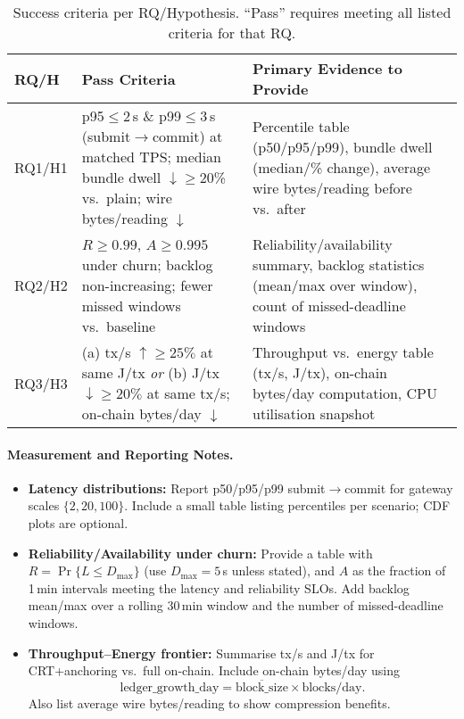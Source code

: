 \documentclass[12pt,onecolumn]{IEEEtran} %
\begin{document}
\begin{table}[htbp]
  \centering
  \caption{Success criteria per RQ/Hypothesis. ``Pass'' requires meeting all listed criteria for that RQ.}
  \label{tab:success-criteria}
  \begin{tabular}{p{2cm} p{9.5cm} p{3.5cm}}
    \toprule
    \textbf{RQ/H} & \textbf{Pass Criteria} & \textbf{Primary Evidence to Provide} \\
    \midrule
    RQ1/H1 &
    p95$\leq$2\,s \& p99$\leq$3\,s (submit$\to$commit) at matched TPS; median bundle dwell $\downarrow\geq$20\% vs.\ plain; wire bytes/reading $\downarrow$ &
    Percentile table (p50/p95/p99), bundle dwell (median/\% change), average wire bytes/reading before vs.\ after \\
    \addlinespace
    RQ2/H2 &
    $R\geq0.99$, $A\geq0.995$ under churn; backlog non-increasing; fewer missed windows vs.\ baseline &
    Reliability/availability summary, backlog statistics (mean/max over window), count of missed-deadline windows \\
    \addlinespace
    RQ3/H3 &
    (a) tx/s $\uparrow\geq25\%$ at same J/tx \emph{or} (b) J/tx $\downarrow\geq20\%$ at same tx/s; on-chain bytes/day $\downarrow$ &
    Throughput vs.\ energy table (tx/s, J/tx), on-chain bytes/day computation, CPU utilisation snapshot \\
    \bottomrule
  \end{tabular}
\end{table}

\paragraph{Measurement and Reporting Notes.}
\begin{itemize}[leftmargin=*, itemsep=0.15em]
  \item \textbf{Latency distributions:} Report p50/p95/p99 submit$\to$commit for gateway scales $\{2,20,100\}$. Include a small table listing percentiles per scenario; CDF plots are optional.
  \item \textbf{Reliability/Availability under churn:} Provide a table with $R=\Pr\{L\le D_{\max}\}$ (use $D_{\max}=5$\,s unless stated), and $A$ as the fraction of 1\,min intervals meeting the latency and reliability SLOs. Add backlog mean/max over a rolling 30\,min window and the number of missed-deadline windows.
  \item \textbf{Throughput–Energy frontier:} Summarise tx/s and J/tx for CRT{+}anchoring vs.\ full on-chain. Include on-chain bytes/day using
    \[
      \text{ledger\_growth\_day}=\overline{\text{block\_size}}\times\text{blocks/day}.
    \]
    Also list average wire bytes/reading to show compression benefits.
\end{itemize}
\end{document}
